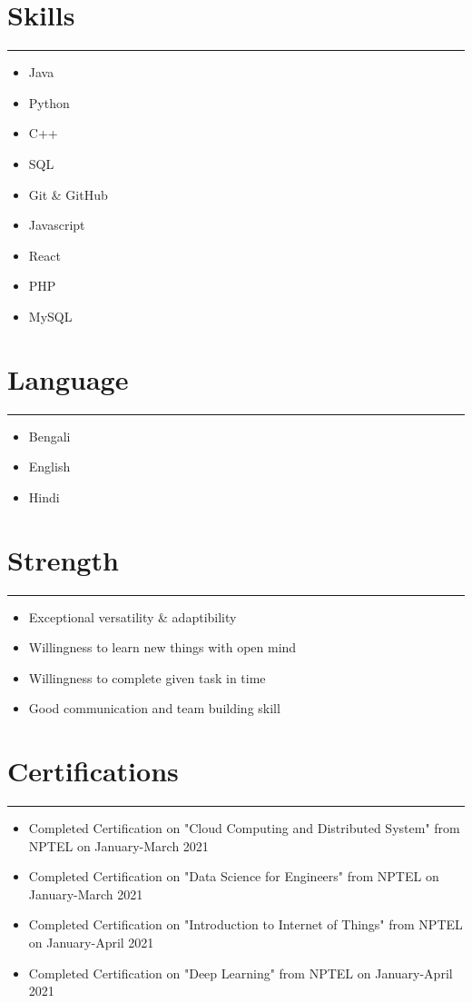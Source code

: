 \documentclass[10pt]{report}
\begin{document}
\section{Skills}
\hrule
\vspace{5pt}
\begin{itemize}
  \item Java
  \item Python
  \item C++
  \item SQL
  \item Git \& GitHub
  \item Javascript
  \item React
  \item PHP
  \item MySQL
\end{itemize}

\section{Language}
\hrule
\vspace{5pt}
\begin{itemize}
    \item Bengali
    \item English
    \item Hindi
\end{itemize}

\section{Strength}
\hrule
\vspace{5pt}
\begin{itemize}
    \item Exceptional versatility \& adaptibility
    \item Willingness to learn new things with open mind
    \item Willingness to complete given task in time
    \item Good communication and team building skill
\end{itemize}

\section{Certifications}
\hrule
\vspace{5pt}
\begin{itemize}
  \item Completed Certification on "Cloud Computing and Distributed System" from NPTEL on January-March 2021
  \item Completed Certification on "Data Science for Engineers" from NPTEL on January-March 2021
  \item Completed Certification on "Introduction to Internet of Things" from NPTEL on January-April 2021
  \item Completed Certification on "Deep Learning" from NPTEL on January-April 2021
\end{itemize}
\end{document}
